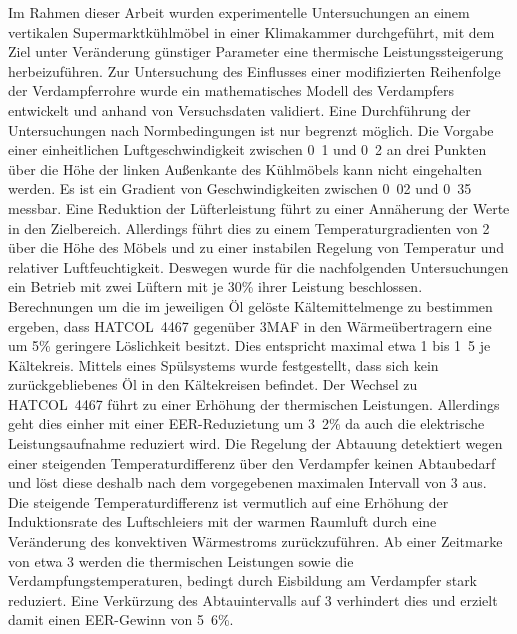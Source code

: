 Im Rahmen dieser Arbeit wurden experimentelle Untersuchungen an einem vertikalen Supermarktkühlmöbel in einer Klimakammer durchgeführt, mit dem Ziel unter Veränderung günstiger Parameter eine thermische Leistungssteigerung herbeizuführen. Zur Untersuchung des Einflusses einer modifizierten Reihenfolge der Verdampferrohre wurde ein mathematisches Modell des Verdampfers entwickelt und anhand von Versuchsdaten validiert. \newline
Eine Durchführung der Untersuchungen nach Normbedingungen ist nur begrenzt möglich. Die Vorgabe einer einheitlichen Luftgeschwindigkeit zwischen \unit{0.1}{\metre\per\second} und \unit{0.2}{\metre\per\second} an drei Punkten über die Höhe der linken Außenkante des Kühlmöbels kann nicht eingehalten werden. Es ist ein Gradient von Geschwindigkeiten zwischen \unit{0.02}{\metre\per\second} und \unit{0.35}{\metre\per\second} messbar. Eine Reduktion der Lüfterleistung führt zu einer Annäherung der Werte in den Zielbereich. Allerdings führt dies zu einem Temperaturgradienten von \unit{2}{\kelvin} über die Höhe des Möbels und zu einer instabilen Regelung von Temperatur und relativer Luftfeuchtigkeit. Deswegen wurde für die nachfolgenden Untersuchungen ein Betrieb mit zwei Lüftern mit je \unit{30}{\%} ihrer Leistung beschlossen. \newline
Berechnungen um die im jeweiligen Öl gelöste Kältemittelmenge zu bestimmen ergeben, dass HATCOL~4467 gegenüber 3MAF in den Wärmeübertragern eine um \unit{5}{\%} geringere Löslichkeit besitzt. Dies entspricht maximal etwa \unit{1}{\gram} bis \unit{1.5}{\gram} je Kältekreis. Mittels eines Spülsystems wurde festgestellt, dass sich kein zurückgebliebenes Öl in den Kältekreisen befindet. Der Wechsel zu HATCOL~4467 führt zu einer Erhöhung der thermischen Leistungen. Allerdings geht dies einher mit einer EER-Reduzietung um \unit{3.2}{\%} da auch die elektrische Leistungsaufnahme reduziert wird. \newline
Die Regelung der Abtauung detektiert wegen einer steigenden Temperaturdifferenz über den Verdampfer keinen Abtaubedarf und löst diese deshalb nach dem vorgegebenen maximalen Intervall von \unit{3}{\hour} aus. Die steigende Temperaturdifferenz ist vermutlich auf eine Erhöhung der Induktionsrate des Luftschleiers mit der warmen Raumluft durch eine Veränderung des konvektiven Wärmestroms zurückzuführen. Ab einer Zeitmarke von etwa \unit{3}{\hour} werden die thermischen Leistungen sowie die Verdampfungstemperaturen, bedingt durch Eisbildung am Verdampfer stark reduziert. Eine Verkürzung des Abtauintervalls auf \unit{3}{\hour} verhindert dies und erzielt damit einen EER-Gewinn von \unit{5.6}{\%}. \newline
